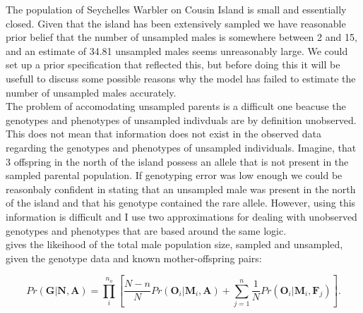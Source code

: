 \documentclass{article}
\begin{document}
The population of Seychelles Warbler on Cousin Island is small and essentially closed. Given that the island has been extensively sampled we have reasonable prior belief that the number of unsampled males is somewhere between 2 and 15, and an estimate of 34.81 unsampled males seems unreasonably large.  We could set up a prior specification that reflected this, but before doing this it will be usefull to discuss some possible reasons why the model has failed to estimate the number of unsampled males accurately.\\

The problem of accomodating unsampled parents is a difficult one beacuse the genotypes and phenotypes of unsampled indivduals are by definition unobserved. This does not mean that information does not exist in the observed data regarding the genotypes and phenotypes of unsampled individuals.  Imagine, that 3 offspring in the north of the island possess an allele that is not present in the sampled parental population. If genotyping error was low enough we could be reasonbaly confident in stating that an unsampled male was present in the north of the island and that his genotype contained the rare allele.  However, using this information is difficult and I use two approximations for dealing with unobserved genotypes and phenotypes that are based around the same logic.\\

\citet{Nielsen.2001} gives the likeihood of the total male population size, sampled and unsampled, given the genotype data and known mother-offspring pairs:

\begin{equation} 
Pr(\bm{G}|\bm{N}, \bm{A}) = \prod^{n_{o}}_{i}\left[\frac{N-n}{N}Pr(\bm{O}_{i}|\bm{M}_{i}, \bm{A}) + \sum_{j=1}^{n}\frac{1}{N}Pr(\bm{O}_{i}|\bm{M}_{i}, \bm{F}_{j})\right].
\label{Nielsen-eq}
\end{equation} 
\end{document}
